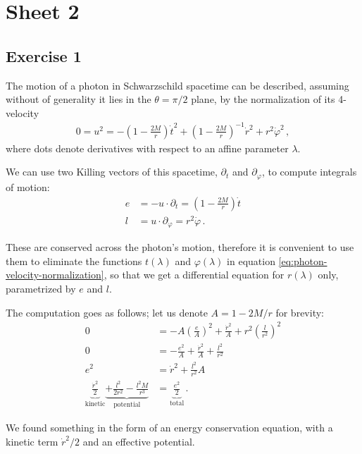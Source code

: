 \documentclass[main.tex]{subfiles}
\begin{document}
\section*{Sheet 2}

\subsection{Exercise 1}

The motion of a photon in Schwarzschild spacetime can be described, 
assuming without of generality it lies in the \(\theta = \pi / 2\) plane, 
by the normalization of its 4-velocity %
\begin{align} \label{eq:photon-velocity-normalization}
0 = u^2 = - \left(1 - \frac{2M}{r}\right) \dot{t}^2 + \left(1 - \frac{2M}{r}\right)^{-1} \dot{r}^2 + r^2 \dot{\varphi}^2
\,,
\end{align}
%
where dots denote derivatives with respect to an affine parameter \(\lambda\). 

We can use two Killing vectors of this spacetime, \(\partial_t\) and \(\partial_\varphi\), 
to compute integrals of motion: %
\begin{align}
e &= - u \cdot \partial_t = \left(1 - \frac{2M}{r}\right) \dot{t}  \\
l &= u \cdot \partial_\varphi = r^2 \dot{\varphi}
\,.
\end{align}

These are conserved across the photon's motion, therefore it is convenient to use them to 
eliminate the functions \(t(\lambda )\) and \(\varphi (\lambda )\) in equation \eqref{eq:photon-velocity-normalization}, 
so that we get a differential equation for \(r(\lambda )\) only, parametrized by \(e\) and \(l\).

The computation goes as follows; let us denote \(A =1 - 2M/r\) for brevity: 
%
\begin{align}
0 &= - A \left( \frac{e}{A}\right)^2 + \frac{\dot{r}^2}{A} + r^2 \left( \frac{l}{r^2}\right)^2   \\
0 &= - \frac{e^2}{A} + \frac{\dot{r}^2}{A} + \frac{l^2}{r^2}  \\
e^2 &= \dot{r}^2 + \frac{l^2}{r^2} A \\
\underbrace{\frac{\dot{r}^2}{2}}_{\text{kinetic}} 
\underbrace{+ \frac{l^2}{2r^2} - \frac{l^2M}{r^3}}_{\text{potential}} &= \underbrace{\frac{e^2}{2}}_{\text{total}} \label{eq:photon-trajectory-schwarzschild}
\,.
\end{align}

We found something in the form of an energy conservation equation, 
with a kinetic term \(\dot{r}^2 / 2\) and an effective potential. 
\end{document}
